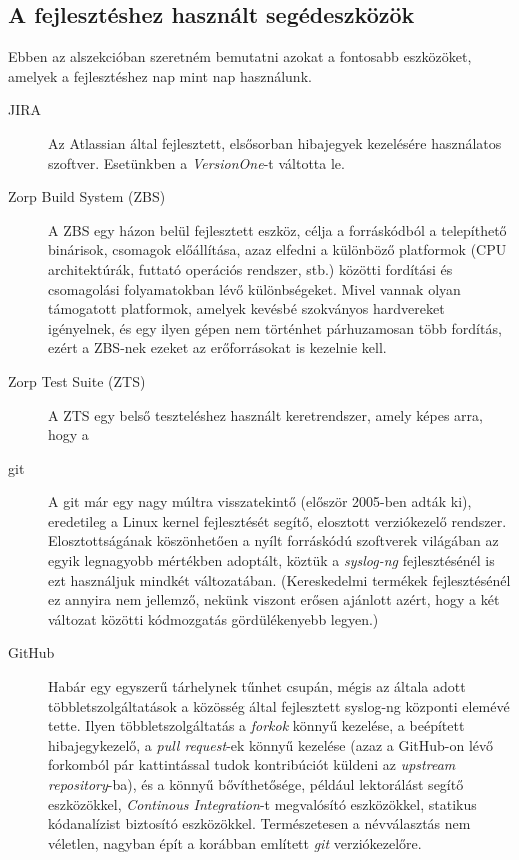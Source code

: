 \subsection{A fejlesztéshez használt segédeszközök}

Ebben az alszekcióban szeretném bemutatni azokat a fontosabb eszközöket, amelyek a fejlesztéshez nap
mint nap használunk.

\begin{description}
    \item[JIRA] {Az Atlassian által fejlesztett, elsősorban hibajegyek kezelésére használatos
        szoftver. Esetünkben a \emph{VersionOne}-t váltotta le.}
    \item[Zorp Build System (ZBS)] {A ZBS egy házon belül fejlesztett eszköz, célja a forráskódból
        a telepíthető binárisok, csomagok előállítása, azaz elfedni a különböző platformok (CPU
        architektúrák, futtató operációs rendszer, stb.) közötti fordítási és csomagolási
        folyamatokban lévő különbségeket. Mivel vannak olyan támogatott platformok, amelyek
        kevésbé szokványos hardvereket igényelnek, és egy ilyen gépen nem történhet párhuzamosan
        több fordítás, ezért a ZBS-nek ezeket az erőforrásokat is kezelnie kell. }
    \item[Zorp Test Suite (ZTS)] { A ZTS egy belső teszteléshez használt keretrendszer, amely
        képes arra, hogy a}
    \item[git] {A git már egy nagy múltra visszatekintő (először 2005-ben adták ki), eredetileg a
        Linux kernel fejlesztését segítő, elosztott verziókezelő rendszer. Elosztottságának
        köszönhetően a nyílt forráskódú szoftverek világában az egyik legnagyobb mértékben
        adoptált, köztük a \emph{syslog-ng} fejlesztésénél is ezt használjuk mindkét változatában.
        (Kereskedelmi termékek fejlesztésénél ez annyira nem jellemző, nekünk viszont erősen
        ajánlott azért, hogy a két változat közötti kódmozgatás gördülékenyebb legyen.)}
    \item[GitHub] {Habár egy egyszerű tárhelynek tűnhet csupán, mégis az általa adott
        többletszolgáltatások a közösség által fejlesztett syslog-ng központi elemévé tette.
        Ilyen többletszolgáltatás a \emph{forkok} könnyű kezelése, a beépített hibajegykezelő,
        a \emph{pull request}-ek könnyű kezelése (azaz a GitHub-on lévő forkomból pár
        kattintással tudok kontribúciót küldeni az \emph{upstream repository}-ba), és a könnyű
        bővíthetősége, például lektorálást segítő eszközökkel, \emph{Continous Integration}-t
        megvalósító eszközökkel, statikus kódanalízist biztosító eszközökkel.
        Természetesen a névválasztás nem véletlen, nagyban épít a korábban említett \emph{git}
        verziókezelőre.}
\end{description}

